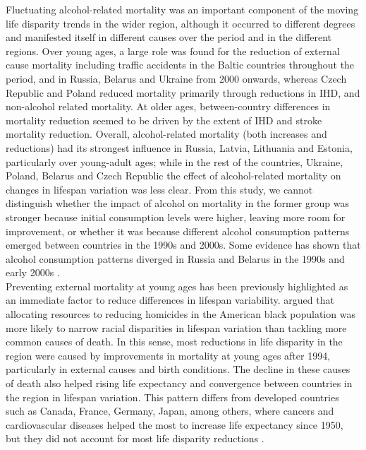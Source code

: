 \documentclass{article}
\begin{document}
\begin{spacing}{1.5}
Fluctuating alcohol-related mortality was an important component of the moving life disparity trends in the wider region, although it occurred to different degrees and manifested itself in different causes over the period and in the different regions.  Over young ages, a large role was found for the reduction of external cause mortality including traffic accidents in the Baltic countries throughout the period, and in Russia, Belarus and Ukraine from 2000 onwards, whereas Czech Republic and Poland reduced mortality primarily through reductions in IHD, and non-alcohol related mortality. At older ages, between-country differences in mortality reduction seemed to be driven by the extent of IHD and stroke mortality reduction. Overall, alcohol-related mortality (both increases and reductions) had its strongest influence in Russia, Latvia, Lithuania and Estonia, particularly over young-adult ages; while in the rest of the countries, Ukraine, Poland, Belarus and Czech Republic the effect of alcohol-related mortality on changes in lifespan variation was less clear. From this study, we cannot distinguish whether the impact of alcohol on mortality in the former group was stronger because initial consumption levels were higher, leaving more room for improvement, or whether it was because different alcohol consumption patterns emerged between countries in the 1990s and 2000s. Some evidence has shown that alcohol consumption patterns diverged in Russia and Belarus in the 1990s and early 2000s \citep{grigoriev2015}. \\

Preventing external mortality at young ages has been previously highlighted as an immediate factor to reduce differences in lifespan variability. \citet{firebaugh2014lifespans} argued that allocating resources to reducing homicides in the American black population was more likely to narrow racial disparities in lifespan variation than tackling more common causes of death. In this sense, most reductions in life disparity in the region were caused by improvements in mortality at young ages after 1994, particularly in external causes and birth conditions. The decline in these causes of death also helped rising life expectancy and convergence between countries in the region in lifespan variation. This pattern differs from developed countries such as Canada, France, Germany, Japan, among others, where cancers and cardiovascular diseases helped the most to increase life expectancy since 1950, but they did not account for most life disparity reductions \citep{seligman2016equity}.\\


\end{spacing}
\end{document}
